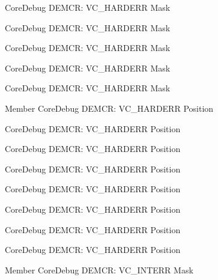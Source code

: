 \begin{DoxyRefList}
\label{deprecated__deprecated000609}%
%
Core\+Debug DEMCR\+: VC\+\_\+\+HARDERR Mask 

\label{deprecated__deprecated000136}%
%
Core\+Debug DEMCR\+: VC\+\_\+\+HARDERR Mask 

\label{deprecated__deprecated000507}%
%
Core\+Debug DEMCR\+: VC\+\_\+\+HARDERR Mask 

\label{deprecated__deprecated000056}%
%
Core\+Debug DEMCR\+: VC\+\_\+\+HARDERR Mask 

\label{deprecated__deprecated000200}%
%
Core\+Debug DEMCR\+: VC\+\_\+\+HARDERR Mask  
\item[Member \doxylink{group__CMSIS__CoreDebug_gaed9f42053031a9a30cd8054623304c0a}{Core\+Debug\+\_\+\+DEMCR\+\_\+\+VC\+\_\+\+HARDERR\+\_\+\+Pos} ]\label{deprecated__deprecated000341}%
%
Core\+Debug DEMCR\+: VC\+\_\+\+HARDERR Position 

\label{deprecated__deprecated000506}%
%
Core\+Debug DEMCR\+: VC\+\_\+\+HARDERR Position 

\label{deprecated__deprecated000417}%
%
Core\+Debug DEMCR\+: VC\+\_\+\+HARDERR Position 

\label{deprecated__deprecated000055}%
%
Core\+Debug DEMCR\+: VC\+\_\+\+HARDERR Position 

\label{deprecated__deprecated000199}%
%
Core\+Debug DEMCR\+: VC\+\_\+\+HARDERR Position 

\label{deprecated__deprecated000274}%
%
Core\+Debug DEMCR\+: VC\+\_\+\+HARDERR Position 

\label{deprecated__deprecated000135}%
%
Core\+Debug DEMCR\+: VC\+\_\+\+HARDERR Position 

\label{deprecated__deprecated000608}%
%
Core\+Debug DEMCR\+: VC\+\_\+\+HARDERR Position  
\item[Member \doxylink{group__CMSIS__CoreDebug_gad6815d8e3df302d2f0ff2c2c734ed29a}{Core\+Debug\+\_\+\+DEMCR\+\_\+\+VC\+\_\+\+INTERR\+\_\+\+Msk} ]\label{deprecated__deprecated000509}%
%
Core\+Debug DEMCR\+: VC\+\_\+\+INTERR Mask 


\end{DoxyRefList}
